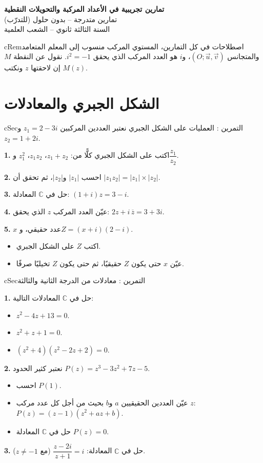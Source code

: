 \documentclass[12pt,a4paper]{article}
\newenvironment{BOX}[2]{\begin{otherlanguage}{english}\begin{arbox}{#1}{#2}}{\end{arbox}\end{otherlanguage}}
\newenvironment{molahada}[1][ملاحظة]{\begin{BOX}{cRem}{#1}}{\end{BOX}}
\newcounter{exo}
\newenvironment{tamrin}[1]{\stepcounter{exo}\begin{BOX}{cSec}{التمرين \theexo: #1}}{\end{BOX}}
\newenvironment{LTR}{\begin{otherlanguage}{english}}{\end{otherlanguage}}
\newenvironment{sq}{\begin{itemize}[leftmargin=2.4em,itemsep=3pt]}{\end{itemize}}
\newcommand{\qa}{\item[(أ)]}\newcommand{\qb}{\item[(ب)]}\newcommand{\qc}{\item[(جـ)]}\newcommand{\qd}{\item[(د)]}\newcommand{\qe}{\item[(هـ)]}
\newcommand{\QQ}[1]{\par\smallskip\textbf{#1.} }
\begin{document}
\begin{LTR}
\begin{tcolorbox}[enhanced,colback=cSec,colframe=cSec,arc=3mm,halign=center,boxrule=0pt,top=12pt,bottom=12pt,before upper={\selectlanguage{arabic}}]
{\color{white}\fontsize{24}{30}\selectfont\bfseries تمارين تجريبية في الأعداد المركبة والتحويلات النقطية}\\[8pt]
{\color{white}\large تمارين متدرجة -- بدون حلول (للتدرّب)}\\[5pt]
{\color{white}\large السنة الثالثة ثانوي -- الشعب العلمية}
\end{tcolorbox}
\end{LTR}
\begin{molahada}[اصطلاحات]
في كل التمارين، المستوي المركب منسوب إلى المعلم المتعامد والمتجانس $(O;\vec u,\vec v)$، و$i$ هو العدد المركب الذي يحقق $i^2=-1$. نقول عن النقطة $M$ إن لاحقتها $z$ ونكتب $M(z)$.
\end{molahada}

\section{الشكل الجبري والمعادلات}

\begin{tamrin}{العمليات على الشكل الجبري}
نعتبر العددين المركبين $z_1=2-3i$ و$z_2=1+2i$.
\QQ{1} اكتب على الشكل الجبري كلًّا من: $z_1+z_2$، $z_1z_2$، $z_1^2$ و$\dfrac{z_1}{z_2}$.
\QQ{2} احسب $|z_1|$ و$|z_2|$، ثم تحقق أن $|z_1z_2|=|z_1|\times|z_2|$.
\QQ{3} حل في $\mathbb{C}$ المعادلة: $(1+i)z=3-i$.
\QQ{4} عيّن العدد المركب $z$ الذي يحقق: $2z+i\,\overline{z}=3+3i$.
\QQ{5} $x$ عدد حقيقي، و$Z=(x+i)(2-i)$.
\begin{sq}
\qa اكتب $Z$ على الشكل الجبري.
\qb عيّن $x$ حتى يكون $Z$ حقيقيًا، ثم حتى يكون $Z$ تخيليًا صرفًا.
\end{sq}
\end{tamrin}

\begin{tamrin}{معادلات من الدرجة الثانية والثالثة}
\QQ{1} حل في $\mathbb{C}$ المعادلات التالية:
\begin{sq}
\qa $z^2-4z+13=0$.
\qb $z^2+z+1=0$.
\qc $(z^2+4)(z^2-2z+2)=0$.
\end{sq}
\QQ{2} نعتبر كثير الحدود $P(z)=z^3-3z^2+7z-5$.
\begin{sq}
\qa احسب $P(1)$.
\qb عيّن العددين الحقيقيين $a$ و$b$ بحيث من أجل كل عدد مركب $z$: $P(z)=(z-1)(z^2+az+b)$.
\qc حل في $\mathbb{C}$ المعادلة $P(z)=0$.
\end{sq}
\QQ{3} حل في $\mathbb{C}$ المعادلة: $\dfrac{z-2i}{z+1}=i$ (مع $z\neq-1$).
\end{tamrin}
\end{document}
